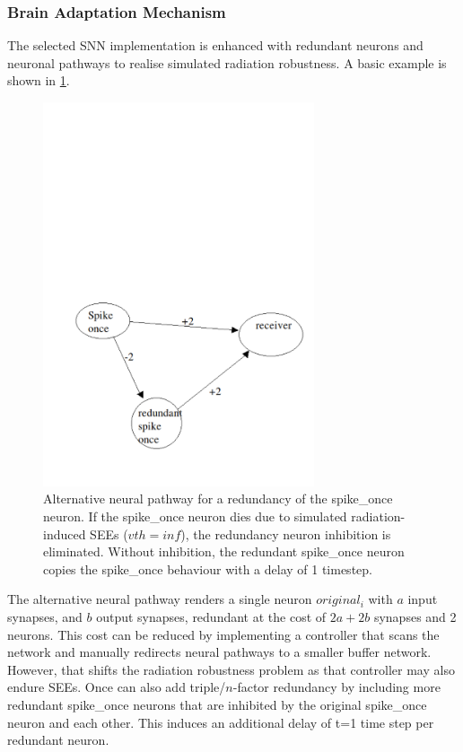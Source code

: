 \subsubsection{Brain Adaptation Mechanism}\label{subsubsec:brain_adaptation_mechanisms}
The selected SNN implementation is enhanced with redundant neurons and neuronal pathways to realise simulated radiation robustness. A basic example is shown in \cref{fig:eg_brain_adaptation}.
\begin{figure}[H]
    \centering
    \includegraphics[width=8cm]{latex/Images/brain_adaptation.pdf}
    \caption{Alternative neural pathway for a redundancy of the spike\_once neuron. If the spike\_once neuron dies due to simulated radiation-induced SEEs ($vth=inf$), the redundancy neuron inhibition is eliminated. Without inhibition, the redundant spike\_once neuron copies the spike\_once behaviour with a delay of 1 timestep.}
    \label{fig:eg_brain_adaptation}
\end{figure}

\noindent The alternative neural pathway renders a single neuron $original_i$ with $a$ input synapses, and $b$ output synapses, redundant at the cost of $2a+2b$ synapses and 2 neurons. This cost can be reduced by implementing a controller that scans the network and manually redirects neural pathways to a smaller buffer network. However, that shifts the radiation robustness problem as that controller may also endure SEEs. %
Once can also add triple/$n$-factor redundancy by including more redundant spike\_once neurons that are inhibited by the original spike\_once neuron and each other. This induces an additional delay of t=1 time step per redundant neuron.

